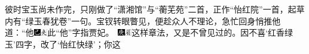 彼时宝玉尚未作完，只刚做了“潇湘馆”与“蘅芜苑”二首，正作“怡红院”一首，起草内有“绿玉春犹卷”一句。宝钗转眼瞥见，便趁众人不理论，急忙回身悄推他道：“他{\includegraphics[width=3mm]{../Images/00003}\includegraphics[width=3mm]{../Images/00012}\footnotesize \kaishu 此“他”字指贾妃。　{\includegraphics[width=3mm]{../Images/00004}\includegraphics[width=3mm]{../Images/00010}\footnotesize \kaishu 这样章法，又是不曾见过的。}}因不喜‘红香绿玉’四字，改了‘怡红快绿’；你这